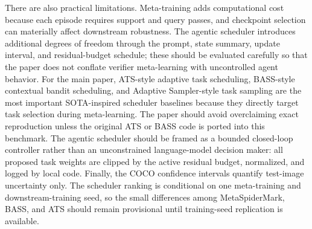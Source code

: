 There are also practical limitations.
Meta-training adds computational cost because each episode requires support and query passes, and checkpoint selection can materially affect downstream robustness.
The agentic scheduler introduces additional degrees of freedom through the prompt, state summary, update interval, and residual-budget schedule; these should be evaluated carefully so that the paper does not conflate verifier meta-learning with uncontrolled agent behavior.
For the main paper, ATS-style adaptive task scheduling, BASS-style contextual bandit scheduling, and Adaptive Sampler-style task sampling are the most important SOTA-inspired scheduler baselines because they directly target task selection during meta-learning.
The paper should avoid overclaiming exact reproduction unless the original ATS or BASS code is ported into this benchmark.
The agentic scheduler should be framed as a bounded closed-loop controller rather than an unconstrained language-model decision maker: all proposed task weights are clipped by the active residual budget, normalized, and logged by local code.
Finally, the COCO confidence intervals quantify test-image uncertainty only.
The scheduler ranking is conditional on one meta-training and downstream-training seed, so the small differences among MetaSpiderMark, BASS, and ATS should remain provisional until training-seed replication is available.
